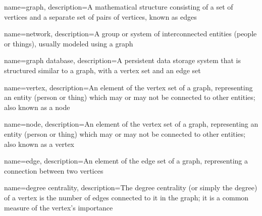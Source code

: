 \usepackage{booktabs}
\usepackage{longtable}
\usepackage{graphicx}
\usepackage[bf,singlelinecheck=off]{caption}
\usepackage[scale=.8]{sourcecodepro}


\usepackage{framed,color}

\renewcommand{\textfraction}{0.05}
\renewcommand{\topfraction}{0.8}
\renewcommand{\bottomfraction}{0.8}
\renewcommand{\floatpagefraction}{0.75}

\renewenvironment{quote}{\begin{VF}}{\end{VF}}
\let\oldhref\href
\renewcommand{\href}[2]{#2\footnote{\url{#1}}}

\makeatletter


\usepackage{makeidx}
\makeindex


\usepackage{amsthm}
\makeatletter
\def\thm@space@setup{%
  \thm@preskip=8pt plus 2pt minus 4pt
  \thm@postskip=\thm@preskip
}
\makeatother

\usepackage[nonumberlist]{glossaries}
\makenoidxglossaries

{
    name={graph},
    description={A mathematical structure consisting of a set of vertices and a separate set of pairs of vertices, known as edges}
}

{
    name={network},
    description={A group or system of interconnected entities (people or things), usually modeled using a graph}
}

{
    name={graph database},
    description={A persistent data storage system that is structured similar to a graph, with a vertex set and an edge set}
}

{
    name={vertex},
    description={An element of the vertex set of a graph, representing an entity (person or thing) which may or may not be connected to other entities; also known as a node}
}

{
    name={node},
    description={An element of the vertex set of a graph, representing an entity (person or thing) which may or may not be connected to other entities; also known as a vertex}
}

{
    name={edge},
    description={An element of the edge set of a graph, representing a connection between two vertices}
}

{
    name={degree centrality},
    description={The degree centrality (or simply the degree) of a vertex is the number of edges connected to it in the graph; it is a common measure of the vertex's importance}
}

